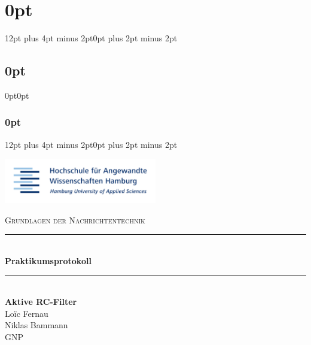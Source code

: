 
\lhead{}
\rhead{}




\usepackage{titlesec}
\titlespacing\section{0pt}{12pt plus 4pt minus 2pt}{0pt plus 2pt minus 2pt}
\titlespacing\subsection{0pt}{0pt}{0pt}
\titlespacing\subsubsection{0pt}{12pt plus 4pt minus 2pt}{0pt plus 2pt minus 2pt}




 	\begin{titlepage}
 		\begin{flushright}
			\includegraphics[width=0.5\textwidth]{img/title.png}\\[2cm]
		\end{flushright}
		
		\begin{center}
			\textsc{\Large Grundlagen der Nachrichtentechnik}
			\rule{\linewidth}{0.5mm}\\[1.5cm]
			{ \huge \bfseries Praktikumsprotokoll}
			\rule{\linewidth}{0.5mm}\\[2cm]
			{ \huge \bfseries Aktive RC-Filter}\\[2cm]

			\LARGE Loïc Fernau \\
			\LARGE Niklas Bammann \\[4cm]
			\large GNP
		\end{center}
	\end{titlepage}
	\newpage
	
	\renewcommand{\baselinestretch}{0.8}\normalsize
	\tableofcontents
	\listoffigures
	\listoftables
	\renewcommand{\baselinestretch}{1.0}\normalsize
	
	\newpage

	\setlength{\headsep}{0.4em}
	

	
	
	
	
	
	


	\newpage



